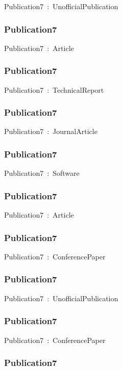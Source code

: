 \documentclass{article}
\begin{document}
Publication7~:~UnofficialPublication

\subsubsection*{Publication7}

Publication7~:~Article

\subsubsection*{Publication7}

Publication7~:~TechnicalReport

\subsubsection*{Publication7}

Publication7~:~JournalArticle

\subsubsection*{Publication7}

Publication7~:~Software

\subsubsection*{Publication7}

Publication7~:~Article

\subsubsection*{Publication7}

Publication7~:~ConferencePaper

\subsubsection*{Publication7}

Publication7~:~UnofficialPublication

\subsubsection*{Publication7}

Publication7~:~ConferencePaper

\subsubsection*{Publication7}
\end{document}
